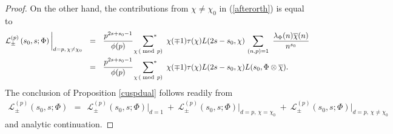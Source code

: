 \documentclass[10pt,a4paper]{amsart}
\begin{document}
\begin{proof}
	On the other hand,  the contributions from $\chi\neq \chi_{0}$ in (\ref{afterorth}) is equal to 
	\begin{align}
			\mathcal{L}^{(p)}_{\pm}\left(s_{0}, s; \Phi\right) \bigg|_{d=p, \, \chi\neq \chi_{0}}  \ \ &= \  \   \frac{p^{2s+s_{0}-1}}{\phi(p)}  \     \sideset{}{^*}{\sum}_{\chi \, (\bmod\, p)} \  \chi(\mp 1)\tau(\chi) L(2s-s_{0}, \chi)  \, \sum_{(n,p)=1} \ \frac{\lambda_{\Phi}(n)\overline{\chi}(n)}{n^{s_{0}}}   \nonumber\\
			\ \ &= \ \   \frac{p^{2s+s_{0}-1}}{\phi(p)}  \     \sideset{}{^*}{\sum}_{\chi \, (\bmod\, p)} \  \chi(\mp 1)\tau(\chi) L(2s-s_{0}, \chi) L(s_{0}, \Phi\otimes \overline{\chi}). \nonumber
	\end{align}
	The conclusion of Proposition \ref{cuspdual} follows readily from
	\begin{align*}
			\mathcal{L}^{(p)}_{\pm}\left(s_{0}, s; \Phi \right)  \ \ = \ \  	\mathcal{L}^{(p)}_{\pm}\left(s_{0}, s; \Phi \right) \bigg|_{d=1} \ + \  	\mathcal{L}^{(p)}_{\pm}\left(s_{0}, s; \Phi\right) \bigg|_{d=p, \, \chi=\chi_{0}}   \ + \ 	\mathcal{L}^{(p)}_{\pm}\left(s_{0}, s; \Phi\right) \bigg|_{d=p, \, \chi\neq \chi_{0}}  
	\end{align*}
	and   analytic continuation. 

\end{proof}
\end{document}
